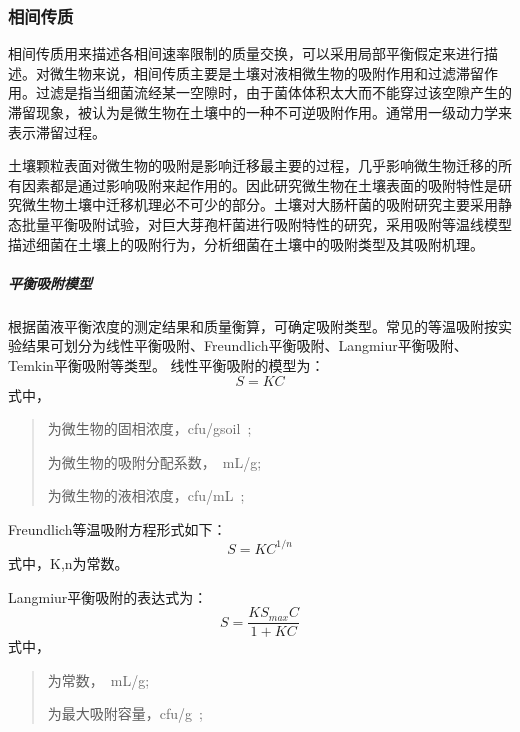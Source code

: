 \documentclass[a4paper,cs4size,adobefonts,fancyhdr]{ctexart}[2005/11/25]
\numberwithin{equation}{section} %
\begin{document}
\subsubsection{相间传质}
相间传质用来描述各相间速率限制的质量交换，可以采用局部平衡假定来进行描述。对微生物来说，相间传质主要是土壤对液相微生物的吸附作用和过滤滞留作用。过滤是指当细菌流经某一空隙时，由于菌体体积太大而不能穿过该空隙产生的滞留现象，被认为是微生物在土壤中的一种不可逆吸附作用。通常用一级动力学来表示滞留过程。\par
土壤颗粒表面对微生物的吸附是影响迁移最主要的过程，几乎影响微生物迁移的所有因素都是通过影响吸附来起作用的。因此研究微生物在土壤表面的吸附特性是研究微生物土壤中迁移机理必不可少的部分。土壤对大肠杆菌的吸附研究主要采用静态批量平衡吸附试验，对巨大芽孢杆菌进行吸附特性的研究，采用吸附等温线模型描述细菌在土壤上的吸附行为，分析细菌在土壤中的吸附类型及其吸附机理。
\subparagraph{平衡吸附模型}
根据菌液平衡浓度的测定结果和质量衡算，可确定吸附类型。常见的等温吸附按实验结果可划分为线性平衡吸附、Freundlich平衡吸附、Langmiur平衡吸附、Temkin平衡吸附等类型。
线性平衡吸附的模型为：
\begin{equation}
S=KC
\end{equation}
式中，
\begin{quote}
	\begin{description}\setlength{\itemsep}{0em}
	\item[$S$]为微生物的固相浓度，\SI{cfu/gsoil};
	\item[$K$]为微生物的吸附分配系数，\SI{}{mL/g};
	\item[$C$]为微生物的液相浓度，\SI{cfu/mL};
	\end{description}
	\end{quote}\par
Freundlich等温吸附方程形式如下：
\begin{equation}
S=KC^{1/n}
\end{equation}
式中，K,n为常数。\par
Langmiur平衡吸附的表达式为：
\begin{equation}
S=\dfrac{KS_{max}C}{1+KC}
\end{equation}
式中，
\begin{quote}
	\begin{description}\setlength{\itemsep}{0em}
	\item[$K$]为常数，\SI{}{mL/g};
	\item[$S_{max}$]为最大吸附容量，\SI{cfu/g};
	\end{description}
	\end{quote}\par
\end{document}
